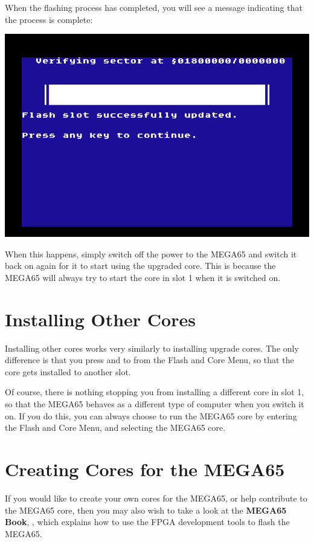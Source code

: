 When the flashing process has completed, you will see a message indicating that the process is complete:

\begin{center}
\includegraphics[trim= 10mm  3mm 10mm 15mm,clip,width=0.7\linewidth]{images/ss-flashmenu-done.png}
\end{center}


When this happens, simply switch off the power to the MEGA65 and switch it back on again for it to start using the
upgraded core.  This is because the MEGA65 will always try to start the core in slot 1 when
it is switched on.

\section{Installing Other Cores}

Installing other cores works very similarly to installing upgrade cores. The only difference is that you
press  and  to  from the Flash and Core Menu, so that the core
gets installed to another slot.

Of course, there is nothing stopping you from installing a different core
in slot 1, so that the MEGA65 behaves as a different type of computer when you switch it on.  If you do this,
you can always choose to run the MEGA65 core by entering the Flash and Core Menu, and selecting the MEGA65
core.

\section{Creating Cores for the MEGA65}

If you would like to create your own cores for the MEGA65, or help
contribute to the MEGA65 core, then
you may also wish to take a look at
\ifdefined\printmanual
the {\bf MEGA65 Book},
\else
{},
\fi
which explains how to use the
FPGA development tools to flash the MEGA65.

